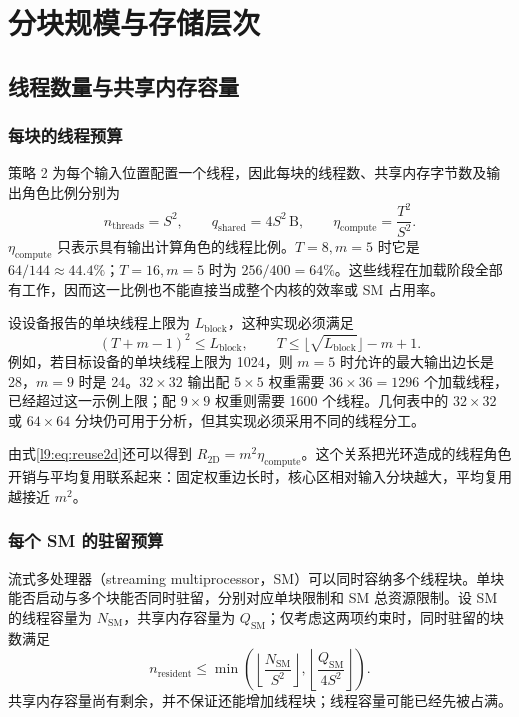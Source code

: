 \section{分块规模与存储层次}
\label{l9:sec:memory}

\subsection{线程数量与共享内存容量}
\subsubsection{每块的线程预算}
策略 2 为每个输入位置配置一个线程，因此每块的线程数、共享内存字节数及输出角色比例分别为
\begin{equation}
 n_{\mathrm{threads}}=S^2,\qquad
 q_{\mathrm{shared}}=4S^2\,\mathrm{B},\qquad
 \eta_{\mathrm{compute}}=\frac{T^2}{S^2}.
 \label{l9:eq:block-resources}
\end{equation}
$\eta_{\mathrm{compute}}$ 只表示具有输出计算角色的线程比例。$T=8,m=5$ 时它是 $64/144\approx44.4\%$；$T=16,m=5$ 时为 $256/400=64\%$。这些线程在加载阶段全部有工作，因而这一比例也不能直接当成整个内核的效率或 SM 占用率。

设设备报告的单块线程上限为 $L_{\mathrm{block}}$，这种实现必须满足
\begin{equation}
 (T+m-1)^2\le L_{\mathrm{block}},
 \qquad
 T\le\lfloor\sqrt{L_{\mathrm{block}}}\rfloor-m+1.
 \label{l9:eq:tile-thread-limit}
\end{equation}
例如，若目标设备的单块线程上限为 1024，则 $m=5$ 时允许的最大输出边长是 28，$m=9$ 时是 24。$32\times32$ 输出配 $5\times5$ 权重需要 $36\times36=1296$ 个加载线程，已经超过这一示例上限；配 $9\times9$ 权重则需要 1600 个线程。几何表中的 $32\times32$ 或 $64\times64$ 分块仍可用于分析，但其实现必须采用不同的线程分工。

由式\eqref{l9:eq:reuse2d}还可以得到 $R_{2\mathrm D}=m^2\eta_{\mathrm{compute}}$。这个关系把光环造成的线程角色开销与平均复用联系起来：固定权重边长时，核心区相对输入分块越大，平均复用越接近 $m^2$。

\subsubsection{每个 SM 的驻留预算}
流式多处理器（streaming multiprocessor，SM）可以同时容纳多个线程块。单块能否启动与多个块能否同时驻留，分别对应单块限制和 SM 总资源限制。设 SM 的线程容量为 $N_{\mathrm{SM}}$，共享内存容量为 $Q_{\mathrm{SM}}$；仅考虑这两项约束时，同时驻留的块数满足
\begin{equation}
 n_{\mathrm{resident}}\le
 \min\!\left(
 \left\lfloor\frac{N_{\mathrm{SM}}}{S^2}\right\rfloor,
 \left\lfloor\frac{Q_{\mathrm{SM}}}{4S^2}\right\rfloor
 \right).
 \label{l9:eq:residency-budget}
\end{equation}
共享内存容量尚有剩余，并不保证还能增加线程块；线程容量可能已经先被占满。

